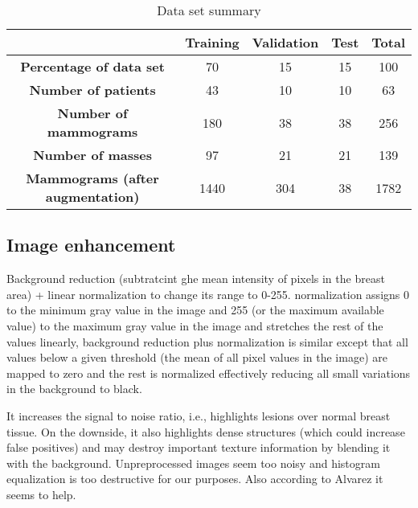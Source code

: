 \begin{table}[h]
	\centering
	\begin{tabular}{ccccc}
		\hline
		&\textbf{Training} & \textbf{Validation} & \textbf{Test} & \textbf{Total}\\
		\hline 
		\textbf{Percentage of data set}	&70	&15	&15	&100\\
		\textbf{Number of patients} &43&10&10&63\\
		\textbf{Number of mammograms} &180&38&38&256\\
		\textbf{Number of masses} &97&21&21&139\\
		\textbf{Mammograms (after augmentation)} &1440&304&38&1782\\
		\hline
	\end{tabular}
	\caption[Data set summary]{Data set summary}
\end{table}

\subsection{Image enhancement}
Background reduction (subtratcint ghe mean intensity of pixels in the breast area) + linear  normalization to change its range to 0-255.
normalization assigns 0 to the minimum gray value in the image and 255 (or the maximum available value) to the maximum gray value in the image and stretches the rest of the values linearly, background reduction plus normalization is similar except that all values below a given threshold (the mean of all pixel values in the image) are mapped to zero and the rest is normalized effectively reducing all small variations in the background to black.

It increases the signal to noise ratio, i.e., highlights lesions over normal breast tissue. On the downside, it also highlights dense structures (which could increase false positives) and may destroy important texture information by blending it with the background. Unpreprocessed images seem too noisy and histogram equalization is too destructive for our purposes.
Also according to Alvarez it seems to help.

